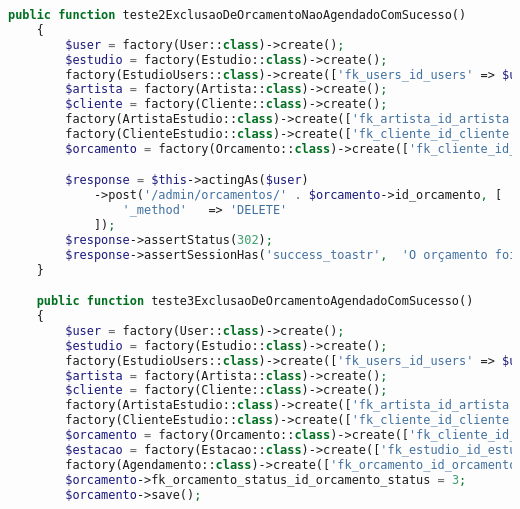 \begin{lstlisting}[language=PHP, caption= Scripts de teste de Listagem e Deleção de Orçamentos, nolol,
label={code:ListagemEDelecaoDeOrcamentosTest}]
    public function teste2ExclusaoDeOrcamentoNaoAgendadoComSucesso()
    {
        $user = factory(User::class)->create();
        $estudio = factory(Estudio::class)->create();
        factory(EstudioUsers::class)->create(['fk_users_id_users' => $user->id, 'fk_estudio_id_estudio' => $estudio->id_estudio]);
        $artista = factory(Artista::class)->create();
        $cliente = factory(Cliente::class)->create();
        factory(ArtistaEstudio::class)->create(['fk_artista_id_artista' => $artista->id_artista, 'fk_estudio_id_estudio' => $estudio->id_estudio]);
        factory(ClienteEstudio::class)->create(['fk_cliente_id_cliente' => $cliente->id_cliente, 'fk_estudio_id_estudio' => $estudio->id_estudio]);
        $orcamento = factory(Orcamento::class)->create(['fk_cliente_id_cliente' => $cliente->id_cliente, 'fk_artista_id_artista' => $artista->id_artista, 'fk_estudio_id_estudio' => $estudio->id_estudio, 'fk_orcamento_status_id_orcamento_status' => 1]);

        $response = $this->actingAs($user)
            ->post('/admin/orcamentos/' . $orcamento->id_orcamento, [
                '_method'   => 'DELETE'
            ]);
        $response->assertStatus(302);
        $response->assertSessionHas('success_toastr',  'O orçamento foi excluído com sucesso!');
    }

    public function teste3ExclusaoDeOrcamentoAgendadoComSucesso()
    {
        $user = factory(User::class)->create();
        $estudio = factory(Estudio::class)->create();
        factory(EstudioUsers::class)->create(['fk_users_id_users' => $user->id, 'fk_estudio_id_estudio' => $estudio->id_estudio]);
        $artista = factory(Artista::class)->create();
        $cliente = factory(Cliente::class)->create();
        factory(ArtistaEstudio::class)->create(['fk_artista_id_artista' => $artista->id_artista, 'fk_estudio_id_estudio' => $estudio->id_estudio]);
        factory(ClienteEstudio::class)->create(['fk_cliente_id_cliente' => $cliente->id_cliente, 'fk_estudio_id_estudio' => $estudio->id_estudio]);
        $orcamento = factory(Orcamento::class)->create(['fk_cliente_id_cliente' => $cliente->id_cliente, 'fk_artista_id_artista' => $artista->id_artista, 'fk_estudio_id_estudio' => $estudio->id_estudio, 'fk_orcamento_status_id_orcamento_status' => 2, 'tempo_estimado' => '  02:00:00', 'valor' => 500.00, 'fk_uso_materiais_id_uso_materiais' => 1, 'fk_complexidade_id_complexidade' => 1, 'observacao' => 'teste3ExclusaoDeOrcamentoAgendadoComSucesso']);
        $estacao = factory(Estacao::class)->create(['fk_estudio_id_estudio' => $estudio->id_estudio]);
        factory(Agendamento::class)->create(['fk_orcamento_id_orcamento' => $orcamento->id_orcamento, 'fk_estacao_id_estacao' => $estacao->id_estacao, 'fk_agendamento_status_id_agendamento_status' => 1]);
        $orcamento->fk_orcamento_status_id_orcamento_status = 3;
        $orcamento->save();


\end{lstlisting}
